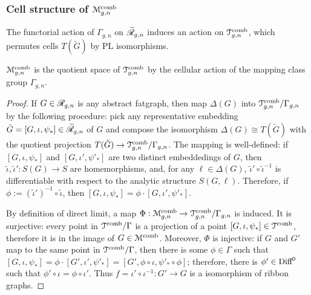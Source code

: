 \subsubsection{Cell structure of $\mathcal{M}\sp{\text{comb}}_{g,n}$}
\label{sec:cell-structure}
The functorial action of $\Gamma_{g,n}$ on $\mathscr{\widetilde R}_{g,n}$ induces an action
on $\mathcal{T}\sp{\text{comb}}_{g,n}$, which permutes cells $T({\tilde G})$ by PL
isomorphisms.
\begin{lemma}
  \label{lemma:penner-kontsevich-bridge}
  $\mathcal{M}\sp{\text{comb}}_{g,n}$ is the quotient space of $\mathcal{T}\sp{\text{comb}}_{g,n}$ by the
  cellular action of the mapping class group $\Gamma_{g,n}$.
\end{lemma}
\begin{proof}
  If $G \in \mathscr{R}_{g,n}$ is any abstract fatgraph, then map $\Delta(G)$ into
  $\mathcal{T}\sp{\text{comb}}_{g,n} / \Gamma_{g,n}$ by the following procedure: pick any representative
  embedding ${\tilde G} = [G, \iota, \psi_*] \in \mathscr{\widetilde R}_{g,n}$ of $G$ and compose
  the isomorphism $\Delta(G) \cong T(\tilde G)$ with the quotient projection
  $T(\tilde G) \to \mathcal{T}\sp{\text{comb}}_{g,n}/\Gamma_{g,n}$.  The mapping is well-defined:
  if $[G, \iota, \psi_*]$ and $[G, \iota', \psi'_*]$ are two distinct embeddedings
  of $G$, then ${\tilde \iota}, {\tilde \iota'}: S(G) \to S$ are homemorphisms,
  and, for any $\ell \in \Delta(G)$, ${\tilde \iota'} \circ {\tilde \iota}^{-1}$ is
  differentiable with respect to the analytic structure $S(G, \ell)$.
  Therefore, if $\phi := ({\tilde \iota}')^{-1} \circ {\tilde \iota}$, then $[G, \iota,
  \psi_*] = \phi \cdot [G, \iota', \psi'_*]$.

  By definition of direct limit, a map $\Phi: \mathcal{M}\sp{\text{comb}}_{g,n} \to
  \mathcal{T}\sp{\text{comb}}_{g,n} / \Gamma_{g,n}$ is induced.  It is surjective: every point in $\mathcal{T}\sp{\text{comb}} /
  \Gamma$ is a projection of a point $[G, \iota, \psi_*] \in \mathcal{T}\sp{\text{comb}}$, therefore it
  is in the image of $G \in \mathcal{M}\sp{\text{comb}}$.  Moreover, $\Phi$ is injective: if $G$ and $G'$
  map to the same point in $\mathcal{T}\sp{\text{comb}} / \Gamma$, then there is some $\phi \in \Gamma$
  such that $[G, \iota, \psi_*] = \phi \cdot [G', \iota', \psi'_*] = [G', \phi \circ \iota, \psi'_* \circ
  \phi]$; therefore, there is $\phi' \in \textrm{Diff}^0$ such that $\phi' \circ \iota = \phi \circ \iota'$.
  Thus $f = \iota' \circ \iota^{-1}: G' \to G$ is a isomorphism of ribbon
  graphs.
\end{proof}

